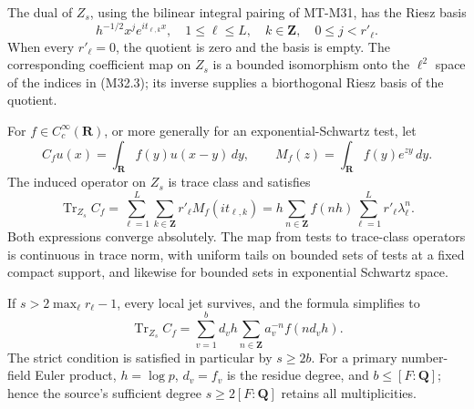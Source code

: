 The dual of $Z_s$, using the bilinear integral pairing of
MT-M31, has the Riesz basis
\[
 h^{-1/2}x^j e^{it_{\ell,k}x},
 \quad 1\leq\ell\leq L,\quad k\in\mathbf Z,
                  \quad0\leq j<r'_\ell.
 \tag{M32.3}
\]
When every $r'_\ell=0$, the quotient is zero and the basis
is empty.  The corresponding coefficient map on $Z_s$
is a bounded isomorphism onto the $\ell^2$ space of the
indices in (M32.3); its inverse supplies a biorthogonal
Riesz basis of the quotient.

For $f\in C_c^\infty(\mathbf R)$, or more generally for
an exponential-Schwartz test, let
\[
 C_f u(x)=\int_{\mathbf R}f(y)u(x-y)\,dy,
 \qquad M_f(z)=\int_{\mathbf R}f(y)e^{zy}\,dy.
 \tag{M32.4}
\]
The induced operator on $Z_s$ is trace class and satisfies
\[
 \operatorname{Tr}_{Z_s} C_f
      =\sum_{\ell=1}^{L}\sum_{k\in\mathbf Z}
                           r'_\ell M_f(it_{\ell,k})
      =h\sum_{n\in\mathbf Z}f(nh)
                          \sum_{\ell=1}^{L}r'_\ell\lambda_\ell^n.
 \tag{M32.5}
\]
Both expressions converge absolutely.  The map from tests
to trace-class operators is continuous in trace norm, with
uniform tails on bounded sets of tests at a fixed compact
support, and likewise for bounded sets in exponential
Schwartz space.

If $s>2\max_\ell r_\ell-1$, every local jet survives,
and the formula simplifies to
\[
 \operatorname{Tr}_{Z_s}C_f
       =\sum_{v=1}^{b}d_vh
                     \sum_{n\in\mathbf Z}a_v^{-n}f(nd_vh).
 \tag{M32.6}
\]
The strict condition is satisfied in particular by
$s\geq2b$.  For a primary number-field Euler product,
$h=\log p$, $d_v=f_v$ is the residue degree, and
$b\leq[F:\mathbf Q]$; hence the source's sufficient
degree $s\geq2[F:\mathbf Q]$ retains all multiplicities.

